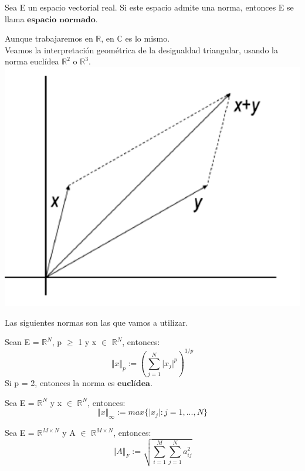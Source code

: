 \begin{ndef}
Sea E un espacio vectorial real. Si este espacio admite una norma, entonces E se llama $\textbf{espacio normado}$.
\end{ndef}

Aunque trabajaremos en $\mathbb{R}$, en $\mathbb{C}$ es lo mismo.\\

Veamos la interpretación geométrica de la desigualdad triangular, usando la norma euclídea $\mathbb{R}^2$ o $\mathbb{R}^3$.\\
\includegraphics[scale=0.2]{media/desigualdadtriangular.png}

Las siguientes normas son las que vamos a utilizar.

\begin{ndef}[Norma p]
Sean E = $\mathbb{R}^N$, p $\geq$ 1 y x $\in$ $\mathbb{R}^N$, entonces:
\[ \Vert x \Vert _{p} := \left( \sum_{j=1}^{N} \vert x_{j} \vert ^p \right) ^{1/p} \]
Si p = 2, entonces la norma es $\textbf{euclídea}$.
\end{ndef}

\begin{ndef}
Sea E = $\mathbb{R}^N$ y x $\in$ $\mathbb{R}^N$, entonces:
\[ \Vert x \Vert _{\infty} := max \lbrace \vert x_{j} \vert : j = 1,...,N \rbrace \]
\end{ndef}

\begin{ndef}
Sea E = $\mathbb{R}^{M \times N}$ y A $\in$ $\mathbb{R}^{M \times N}$, entonces:
\[ \Vert A \Vert _F := \sqrt{\sum_{i=1}^{M} \sum_{j=1}^{N} a_{ij}^2} \]
\end{ndef}

